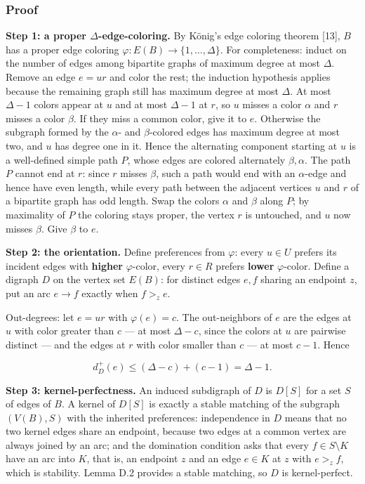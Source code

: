 \documentclass[
  american,
  11pt,
  a4paper,
]{article}
\begin{document}
\subsubsection{Proof}\label{proof-11}

\textbf{Step 1: a proper \(\Delta\)-edge-coloring.} By König's edge coloring theorem {[}13{]}, \(B\) has a proper edge coloring \(\varphi:E(B)\to\{1,\ldots,\Delta\}\). For completeness: induct on the number of edges among bipartite graphs of maximum degree at most \(\Delta\). Remove an edge \(e=ur\) and color the rest; the induction hypothesis applies because the remaining graph still has maximum degree at most \(\Delta\). At most \(\Delta-1\) colors appear at \(u\) and at most \(\Delta-1\) at \(r\), so \(u\) misses a color \(\alpha\) and \(r\) misses a color \(\beta\). If they miss a common color, give it to \(e\). Otherwise the subgraph formed by the \(\alpha\)- and \(\beta\)-colored edges has maximum degree at most two, and \(u\) has degree one in it. Hence the alternating component starting at \(u\) is a well-defined simple path \(P\), whose edges are colored alternately \(\beta,\alpha\). The path \(P\) cannot end at \(r\): since \(r\) misses \(\beta\), such a path would end with an \(\alpha\)-edge and hence have even length, while every path between the adjacent vertices \(u\) and \(r\) of a bipartite graph has odd length. Swap the colors \(\alpha\) and \(\beta\) along \(P\); by maximality of \(P\) the coloring stays proper, the vertex \(r\) is untouched, and \(u\) now misses \(\beta\). Give \(\beta\) to \(e\).

\textbf{Step 2: the orientation.} Define preferences from \(\varphi\): every \(u\in U\) prefers its incident edges with \textbf{higher} \(\varphi\)-color, every \(r\in R\) prefers \textbf{lower} \(\varphi\)-color. Define a digraph \(D\) on the vertex set \(E(B)\): for distinct edges \(e,f\) sharing an endpoint \(z\), put an arc \(e\to f\) exactly when \(f>_ze\).

Out-degrees: let \(e=ur\) with \(\varphi(e)=c\). The out-neighbors of \(e\) are the edges at \(u\) with color greater than \(c\) --- at most \(\Delta-c\), since the colors at \(u\) are pairwise distinct --- and the edges at \(r\) with color smaller than \(c\) --- at most \(c-1\). Hence

\[
d^+_D(e)\le(\Delta-c)+(c-1)=\Delta-1.
\]

\textbf{Step 3: kernel-perfectness.} An induced subdigraph of \(D\) is \(D[S]\) for a set \(S\) of edges of \(B\). A kernel of \(D[S]\) is exactly a stable matching of the subgraph \((V(B),S)\) with the inherited preferences: independence in \(D\) means that no two kernel edges share an endpoint, because two edges at a common vertex are always joined by an arc; and the domination condition asks that every \(f\in S\setminus K\) have an arc into \(K\), that is, an endpoint \(z\) and an edge \(e\in K\) at \(z\) with \(e>_zf\), which is stability. Lemma D.2 provides a stable matching, so \(D\) is kernel-perfect.
\end{document}
